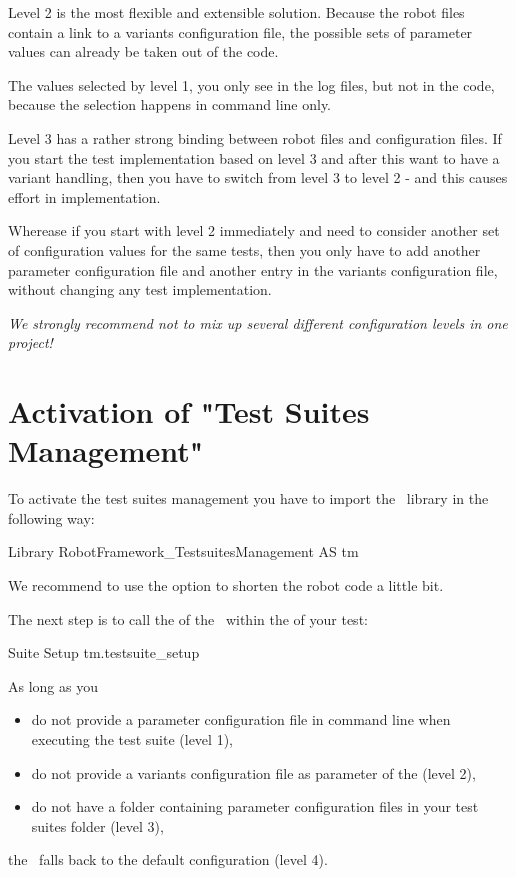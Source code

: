 Level 2 is the most flexible and extensible solution. Because the robot files contain a link to a variants configuration file,
the possible sets of parameter values can already be taken out of the code.

The values selected by level 1, you only see in the log files, but not in the code, because the selection happens in command line only.

Level 3 has a rather strong binding between robot files and configuration files. If you start the test implementation based on level 3
and after this want to have a variant handling, then you have to switch from level 3 to level 2 - and this causes effort in implementation.

Wherease if you start with level 2 immediately and need to consider another set of configuration values for the same tests, then you only have to add
another parameter configuration file and another entry in the variants configuration file, without changing any test implementation.

\textit{We strongly recommend not to mix up several different configuration levels in one project!}


\section{Activation of "Test Suites Management"}

To activate the test suites management you have to import the \pkg\ library in the following way:

\begin{robotcode}
Library    RobotFramework_TestsuitesManagement    AS    tm
\end{robotcode}

We recommend to use the  option to shorten the robot code a little bit.

The next step is to call the  of the \pkg\ within the  of your test:

\begin{robotcode}
Suite Setup    tm.testsuite_setup
\end{robotcode}

As long as you
\begin{itemize}
   \item do not provide a parameter configuration file in command line when executing the test suite (level 1),
   \item do not provide a variants configuration file as parameter of the  (level 2),
   \item do not have a  folder containing parameter configuration files in your test suites folder (level 3),
\end{itemize}
the \pkg\ falls back to the default configuration (level 4).


